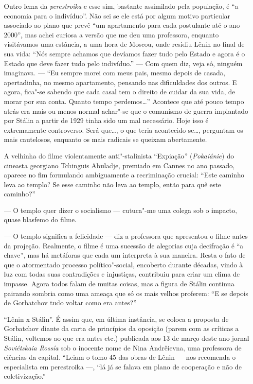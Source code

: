 Outro lema da \emph{perestroika} e esse sim, bastante assimilado pela
população, é ``a economia para o indivíduo''. Não sei se ele está por
algum motivo particular associado ao plano que prevê ``um apartamento
para cada postulante até o ano 2000'', mas achei curiosa a versão que me
deu uma professora, enquanto visitávamos uma estância, a uma hora de
Moscou, onde residiu Lênin no final de sua vida: ``Nós sempre achamos
que devíamos fazer tudo pelo Estado e agora é o Estado que deve fazer
tudo pelo indivíduo.'' --- Com quem diz, veja só, ninguém imaginava. ---
``Eu sempre morei com meus pais, mesmo depois de casada, apertadinha, no
mesmo apartamento, pensando nas dificuldades dos outros. E agora,
fica"-se sabendo que cada casal tem o direito de cuidar da sua vida, de
morar por sua conta. Quanto tempo perdemos\ldots{}'' Acontece que até pouco
tempo atrás era mais ou menos normal achar"-se que o comunismo de guerra
implantado por Stálin a partir de 1929 tinha sido um mal necessário.
Hoje isso é extremamente controverso. Será que\ldots{}, o que teria
acontecido se\ldots{}, perguntam os mais cautelosos, enquanto os mais
radicais se queixam abertamente.

A velhinha do filme violentamente anti"-stalinista ``Expiação''
(\emph{Pokaiánie}) do cineasta georgiano Tchinguis Abuladje, premiado em
Cannes no ano passado, aparece no fim formulando ambiguamente a
recriminação crucial: ``Este caminho leva ao templo? Se esse caminho não
leva ao templo, então para quê este caminho?''

--- O templo quer dizer o socialismo --- cutuca"-me uma colega sob o
impacto, quase blasfemo do filme.

--- O templo significa a felicidade --- diz a professora que apresentou o
filme antes da projeção. Realmente, o filme é uma sucessão de alegorias
cuja decifração é ``a chave'', mas há metáforas que cada um interpreta à
sua maneira. Resta o fato de que o atormentado processo político"-social,
encoberto durante décadas, vindo à luz com todas suas contradições e
injustiças, contribuiu para criar um clima de impasse. Agora todos falam
de muitas coisas, mas a figura de Stálin continua pairando sombria como
uma ameaça que só os mais velhos proferem: ``E se depois de Gorbatchov
tudo voltar como era antes?''

``Lênin x Stálin''. É assim que, em última instância, se coloca a
proposta de Gorbatchov diante da carta de princípios da oposição (parem
com as críticas a Stálin, voltemos ao que era antes etc.) publicada aos
13 de março deste ano jornal \emph{Soviétskaia Rossía} sob o inocente
nome de Nina Andrêievna, uma professora de ciências da capital. ``Leiam
o tomo 45 das obras de Lênin --- nos recomenda o especialista em
perestroika ---, ``lá já se falava em plano de cooperação e não de
coletivização.''

